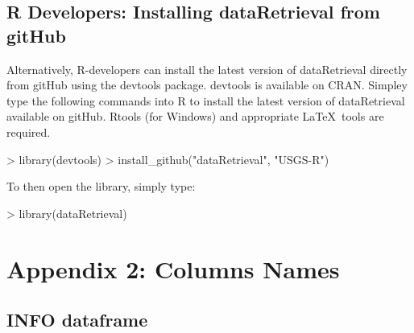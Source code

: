 \documentclass[a4paper,11pt]{article}
\begin{document}
\subsection{R Developers: Installing dataRetrieval from gitHub}
Alternatively, R-developers can install the latest version of dataRetrieval directly from gitHub using the devtools package.  devtools is available on CRAN.  Simpley type the following commands into R to install the latest version of dataRetrieval available on gitHub.  Rtools (for Windows) and appropriate \LaTeX\ tools are required.

\begin{Schunk}
\begin{Sinput}
> library(devtools)
> install_github("dataRetrieval", "USGS-R")
\end{Sinput}
\end{Schunk}
To then open the library, simply type:

\begin{Schunk}
\begin{Sinput}
> library(dataRetrieval)
\end{Sinput}
\end{Schunk}


\section{Appendix 2: Columns Names}
\subsection{INFO dataframe}
\end{document}
